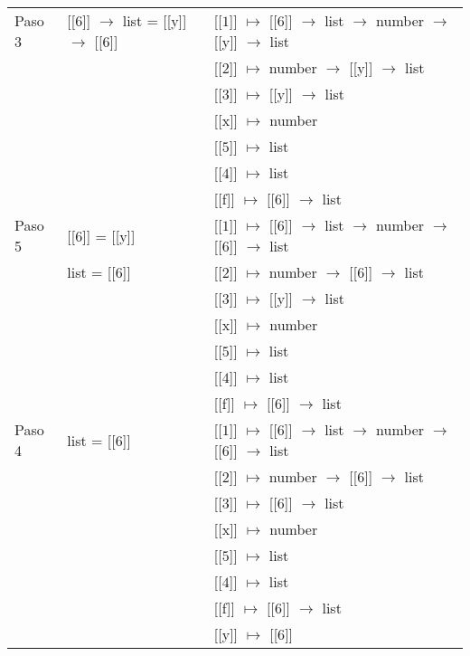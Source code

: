 \documentclass[12pt]{article}
\begin{document}
\begin{center}
\begin{longtable}{ | l | p{10 cm} | p{5 cm} | }
        Paso 3 & [[$\boxed{6}$]] $\rightarrow$ list = [[y]] $\rightarrow$ [[$\boxed{6}$]] & [[$\boxed{1}$]] $\mapsto$ [[$\boxed{6}$]] $\rightarrow$ list $\rightarrow$ number $\rightarrow$ [[y]] $\rightarrow$ list \\
        & & [[$\boxed{2}$]] $\mapsto$ number $\rightarrow$ [[y]] $\rightarrow$ list \\
        & & [[$\boxed{3}$]] $\mapsto$ [[y]] $\rightarrow$ list \\
        & & [[x]] $\mapsto$ number \\
        & & [[$\boxed{5}$]] $\mapsto$ list \\
        & & [[$\boxed{4}$]] $\mapsto$ list \\
        & & [[f]] $\mapsto$ [[$\boxed{6}$]] $\rightarrow$ list \\ \hline
        
        Paso 5 & [[$\boxed{6}$]] = [[y]] & [[$\boxed{1}$]] $\mapsto$ [[$\boxed{6}$]] $\rightarrow$ list $\rightarrow$ number $\rightarrow$ [[$\boxed{6}$]] $\rightarrow$ list \\
        & list = [[$\boxed{6}$]] & [[$\boxed{2}$]] $\mapsto$ number $\rightarrow$ [[$\boxed{6}$]] $\rightarrow$ list \\
        & & [[$\boxed{3}$]] $\mapsto$ [[y]] $\rightarrow$ list \\
        & & [[x]] $\mapsto$ number \\
        & & [[$\boxed{5}$]] $\mapsto$ list \\
        & & [[$\boxed{4}$]] $\mapsto$ list \\
        & & [[f]] $\mapsto$ [[$\boxed{6}$]] $\rightarrow$ list \\ \hline
        
        Paso 4 & list = [[$\boxed{6}$]] & [[$\boxed{1}$]] $\mapsto$ [[$\boxed{6}$]] $\rightarrow$ list $\rightarrow$ number $\rightarrow$ [[$\boxed{6}$]] $\rightarrow$ list \\
        & & [[$\boxed{2}$]] $\mapsto$ number $\rightarrow$ [[$\boxed{6}$]] $\rightarrow$ list \\
        & & [[$\boxed{3}$]] $\mapsto$ [[$\boxed{6}$]] $\rightarrow$ list \\
        & & [[x]] $\mapsto$ number \\
        & & [[$\boxed{5}$]] $\mapsto$ list \\
        & & [[$\boxed{4}$]] $\mapsto$ list \\
        & & [[f]] $\mapsto$ [[$\boxed{6}$]] $\rightarrow$ list \\
        & & [[y]] $\mapsto$ [[$\boxed{6}$]] \\ \hline
        

\end{longtable}
\end{center}
\end{document}
